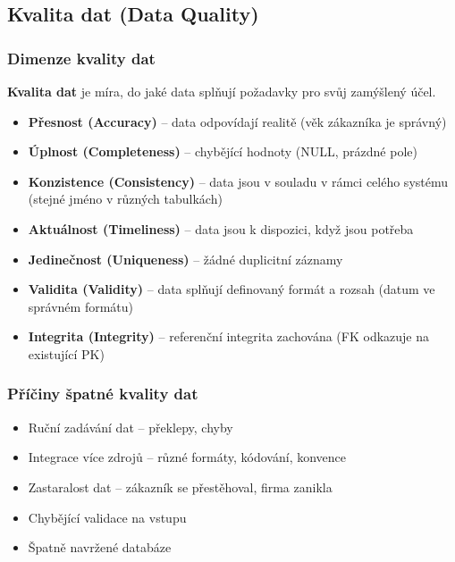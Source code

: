 \subsection{Kvalita dat (Data Quality)}

\subsubsection{Dimenze kvality dat}

\textbf{Kvalita dat} je míra, do jaké data splňují požadavky pro svůj zamýšlený účel.

\begin{itemize}
  \item \textbf{Přesnost (Accuracy)} -- data odpovídají realitě (věk zákazníka je správný)
  \item \textbf{Úplnost (Completeness)} -- chybějící hodnoty (NULL, prázdné pole)
  \item \textbf{Konzistence (Consistency)} -- data jsou v souladu v rámci celého systému (stejné jméno v různých tabulkách)
  \item \textbf{Aktuálnost (Timeliness)} -- data jsou k dispozici, když jsou potřeba
  \item \textbf{Jedinečnost (Uniqueness)} -- žádné duplicitní záznamy
  \item \textbf{Validita (Validity)} -- data splňují definovaný formát a rozsah (datum ve správném formátu)
  \item \textbf{Integrita (Integrity)} -- referenční integrita zachována (FK odkazuje na existující PK)
\end{itemize}

\subsubsection{Příčiny špatné kvality dat}

\begin{itemize}
  \item Ruční zadávání dat -- překlepy, chyby
  \item Integrace více zdrojů -- různé formáty, kódování, konvence
  \item Zastaralost dat -- zákazník se přestěhoval, firma zanikla
  \item Chybějící validace na vstupu
  \item Špatně navržené databáze
\end{itemize}

